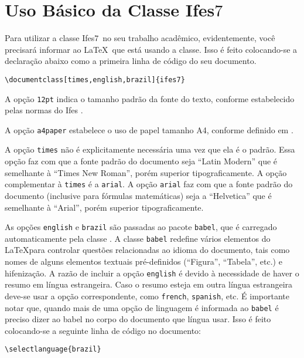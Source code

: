 \documentclass[times,english,brazil,oneside]{ifes7}
\newcommand{\ifestex}{\textsf{Ifes$7$}}
\begin{document}
\section{Uso Básico da Classe \ifestex}
\label{sec:uso-basico}

Para utilizar a classe \ifestex\ no seu trabalho acadêmico,
evidentemente, você precisará informar ao \LaTeX\ que está usando a
classe. Isso é feito colocando-se a declaração abaixo como a primeira
linha de código do seu documento.\vspace{\baselineskip}

\begin{lstlisting}[language={[LaTeX]TeX}]
  \documentclass[times,english,brazil]{ifes7}  
\end{lstlisting}

A opção \texttt{12pt} indica o tamanho padrão da fonte do texto,
conforme estabelecido pelas normas do Ifes \cite[pp.~20]{Ifes2014}.

A opção \texttt{a4paper} estabelece o uso de papel tamanho A4,
conforme definido em \cite[pp.~19]{Ifes2014}.

A opção \texttt{times} não é explicitamente necessária uma vez que ela
é o padrão. Essa opção faz com que a fonte padrão do documento seja
“Latin Modern” que é semelhante à “Times New Roman”, porém superior
tipograficamente. A opção complementar à \texttt{times} é a
\texttt{arial}. A opção \texttt{arial} faz com que a fonte padrão do
documento (inclusive para fórmulas matemáticas) seja a “Helvetica” que
é semelhante à “Arial”, porém superior tipograficamente.

As opções \texttt{english} e \texttt{brazil} são passadas ao pacote
\texttt{babel}, que é carregado automaticamente pela classe \abnTeX.
A classe \texttt{babel} redefine vários elementos do \LaTeX para
controlar questões relacionadas ao idioma do documento, tais como
nomes de alguns elementos textuais pré-definidos (``Figura'',
``Tabela'', etc.) e hifenização. A razão de incluir a opção
\texttt{english} é devido à necessidade de haver o resumo em língua
estrangeira. Caso o resumo esteja em outra língua estrangeira deve-se
usar a opção correspondente, como \texttt{french}, \texttt{spanish},
etc. É importante notar que, quando mais de uma opção de linguagem é
informada ao \texttt{babel} é preciso dizer ao babel no corpo do
documento que língua usar. Isso é feito colocando-se a seguinte linha
de código no documento:\vspace{\baselineskip}

\begin{lstlisting}[language={[LaTeX]TeX}]
  \selectlanguage{brazil}  
\end{lstlisting}
\end{document}
